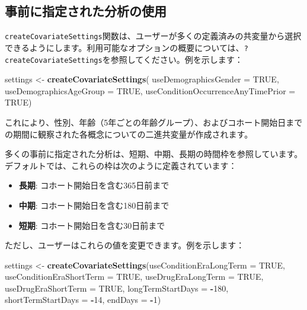 \documentclass[
  11pt]{book}
\newenvironment{Shaded}{\begin{snugshade}}{\end{snugshade}}
\newcommand{\AttributeTok}[1]{\textcolor[rgb]{0.13,0.29,0.53}{#1}}
\newcommand{\ConstantTok}[1]{\textcolor[rgb]{0.56,0.35,0.01}{#1}}
\newcommand{\DecValTok}[1]{\textcolor[rgb]{0.00,0.00,0.81}{#1}}
\newcommand{\FunctionTok}[1]{\textcolor[rgb]{0.13,0.29,0.53}{\textbf{#1}}}
\newcommand{\NormalTok}[1]{#1}
\newcommand{\OtherTok}[1]{\textcolor[rgb]{0.56,0.35,0.01}{#1}}
\newcommand{\SpecialCharTok}[1]{\textcolor[rgb]{0.81,0.36,0.00}{\textbf{#1}}}
\providecommand{\tightlist}{%
  \setlength{\itemsep}{0pt}\setlength{\parskip}{0pt}}
\theoremstyle{definition}
\theoremstyle{definition}
\theoremstyle{definition}
\theoremstyle{definition}
\theoremstyle{remark}
\begin{document}
\subsection{事前に指定された分析の使用}\label{ux4e8bux524dux306bux6307ux5b9aux3055ux308cux305fux5206ux6790ux306eux4f7fux7528}

\texttt{createCovariateSettings}関数は、ユーザーが多くの定義済みの共変量から選択できるようにします。利用可能なオプションの概要については、\texttt{?createCovariateSettings}を参照してください。例を示します：

\begin{Shaded}
\begin{Highlighting}[]
\NormalTok{settings }\OtherTok{\textless{}{-}} \FunctionTok{createCovariateSettings}\NormalTok{(}
  \AttributeTok{useDemographicsGender =} \ConstantTok{TRUE}\NormalTok{,}
  \AttributeTok{useDemographicsAgeGroup =} \ConstantTok{TRUE}\NormalTok{,}
  \AttributeTok{useConditionOccurrenceAnyTimePrior =} \ConstantTok{TRUE}\NormalTok{)}
\end{Highlighting}
\end{Shaded}

これにより、性別、年齢（5年ごとの年齢グループ）、およびコホート開始日までの期間に観察された各概念についての二進共変量が作成されます。

多くの事前に指定された分析は、短期、中期、長期の時間枠を参照しています。デフォルトでは、これらの枠は次のように定義されています：

\begin{itemize}
\tightlist
\item
  \textbf{長期}: コホート開始日を含む365日前まで
\item
  \textbf{中期}: コホート開始日を含む180日前まで
\item
  \textbf{短期}: コホート開始日を含む30日前まで
\end{itemize}

ただし、ユーザーはこれらの値を変更できます。例を示します：

\begin{Shaded}
\begin{Highlighting}[]
\NormalTok{settings }\OtherTok{\textless{}{-}} \FunctionTok{createCovariateSettings}\NormalTok{(}\AttributeTok{useConditionEraLongTerm =} \ConstantTok{TRUE}\NormalTok{,}
                                    \AttributeTok{useConditionEraShortTerm =} \ConstantTok{TRUE}\NormalTok{,}
                                    \AttributeTok{useDrugEraLongTerm =} \ConstantTok{TRUE}\NormalTok{,}
                                    \AttributeTok{useDrugEraShortTerm =} \ConstantTok{TRUE}\NormalTok{,}
                                    \AttributeTok{longTermStartDays =} \SpecialCharTok{{-}}\DecValTok{180}\NormalTok{,}
                                    \AttributeTok{shortTermStartDays =} \SpecialCharTok{{-}}\DecValTok{14}\NormalTok{,}
                                    \AttributeTok{endDays =} \SpecialCharTok{{-}}\DecValTok{1}\NormalTok{)}
\end{Highlighting}
\end{Shaded}
\end{document}
